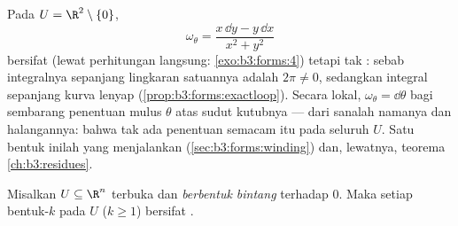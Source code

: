 \begin{example}\label{ex:b3:forms:angular}
Pada $U = \R^2 \setminus \{0\}$,
\[
\omega_\theta = \frac{x\,\dd y - y\,\dd x}{x^2 + y^2}
\]
bersifat  (lewat perhitungan langsung:
\cref{exo:b3:forms:4}) tetapi tak : sebab integralnya sepanjang
lingkaran satuannya adalah $2\pi \neq 0$, sedangkan integral 
sepanjang kurva  lenyap (\cref{prop:b3:forms:exactloop}).
Secara lokal, $\omega_\theta = \dd\theta$ bagi sembarang penentuan
mulus $\theta$ atas sudut kutubnya --- dari sanalah
namanya dan halangannya: bahwa tak ada penentuan semacam itu pada
seluruh $U$. Satu bentuk inilah yang menjalankan 
(\cref{sec:b3:forms:winding}) dan, lewatnya, teorema 
\cref{ch:b3:residues}.
\end{example}

\begin{theorem}\label{thm:b3:forms:poincare}
Misalkan $U \subseteq \R^n$ terbuka dan \emph{berbentuk bintang}
terhadap $0$. Maka setiap bentuk-$k$  pada $U$ ($k \geq 1$)
bersifat .
\end{theorem}

